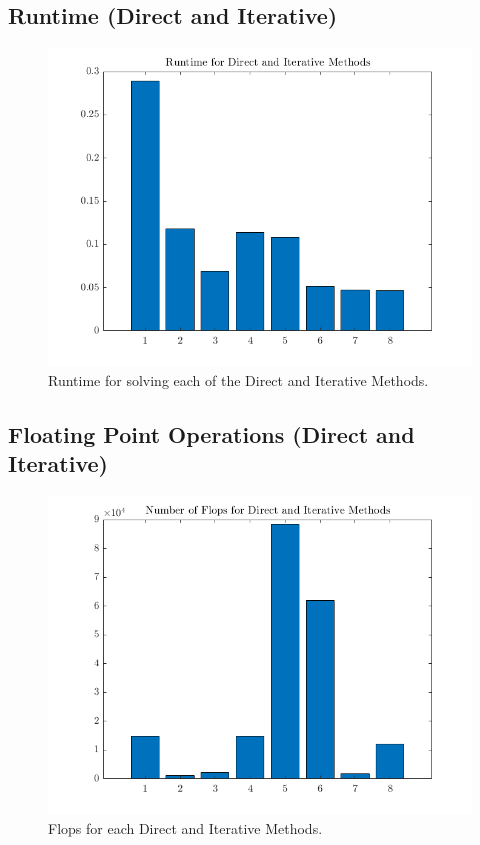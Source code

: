 \documentclass[12pt,a4paper]{article}
\begin{document}
\subsection{Runtime (Direct and Iterative)}
\begin{figure}[H]
	\includegraphics[width=\linewidth]{images/RuntimeGraph.png}
	\caption{Runtime for solving each of the Direct and Iterative Methods.}
	\label{fig:runtime}
\end{figure}

\subsection{Floating Point Operations (Direct and Iterative)}
\begin{figure}[H]
	\includegraphics[width=\linewidth]{images/FlopsGraph.png}
	\caption{Flops for each Direct and Iterative Methods.}
	\label{fig:flops}
\end{figure}
\end{document}
